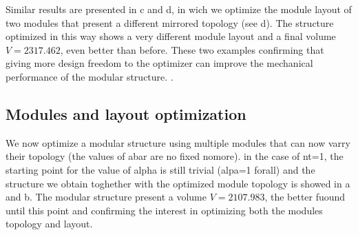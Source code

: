 Similar results are presented in c and d, in wich we optimize the module layout of two modules that present a different mirrored topology (see d). The structure optimized in this way shows a very different module layout and a final volume $V = 2317.462$, even better than before. These two examples confirming that giving more design freedom to the optimizer can improve the mechanical performance of the modular structure. .

\subsection{Modules and layout optimization}
We now optimize a modular structure using multiple modules that can now varry their topology (the values of abar are no fixed nomore). in the case of nt=1, the starting point for the value of alpha is still trivial (alpa=1 forall) and the structure we obtain toghether with the optimized module topology is showed in a and b. The modular structure present a volume $V = 2107.983$, the better fuound until this point and confirming the interest in optimizing both the modules topology and layout.
\begin{figure}
    \hspace*{\fill}
    \hfill
    \hspace*{\fill}
    \caption{}
    \label{fig:06_module_topol_opt}
\end{figure}

